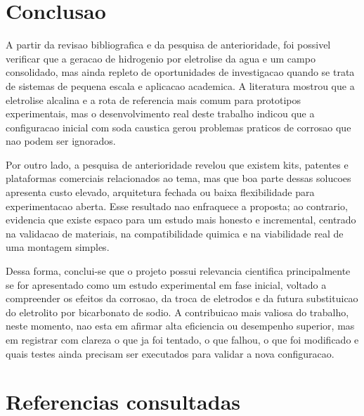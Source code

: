 \documentclass[12pt,oneside,a4paper,english,brazilian]{abntex2}
\begin{document}
\section{Conclusao}

A partir da revisao bibliografica e da pesquisa de anterioridade, foi possivel verificar que a geracao de hidrogenio por eletrolise da agua e um campo consolidado, mas ainda repleto de oportunidades de investigacao quando se trata de sistemas de pequena escala e aplicacao academica. A literatura mostrou que a eletrolise alcalina e a rota de referencia mais comum para prototipos experimentais, mas o desenvolvimento real deste trabalho indicou que a configuracao inicial com soda caustica gerou problemas praticos de corrosao que nao podem ser ignorados.

Por outro lado, a pesquisa de anterioridade revelou que existem kits, patentes e plataformas comerciais relacionados ao tema, mas que boa parte dessas solucoes apresenta custo elevado, arquitetura fechada ou baixa flexibilidade para experimentacao aberta. Esse resultado nao enfraquece a proposta; ao contrario, evidencia que existe espaco para um estudo mais honesto e incremental, centrado na validacao de materiais, na compatibilidade quimica e na viabilidade real de uma montagem simples.

Dessa forma, conclui-se que o projeto possui relevancia cientifica principalmente se for apresentado como um estudo experimental em fase inicial, voltado a compreender os efeitos da corrosao, da troca de eletrodos e da futura substituicao do eletrolito por bicarbonato de sodio. A contribuicao mais valiosa do trabalho, neste momento, nao esta em afirmar alta eficiencia ou desempenho superior, mas em registrar com clareza o que ja foi tentado, o que falhou, o que foi modificado e quais testes ainda precisam ser executados para validar a nova configuracao.

\section{Referencias consultadas}
\end{document}
